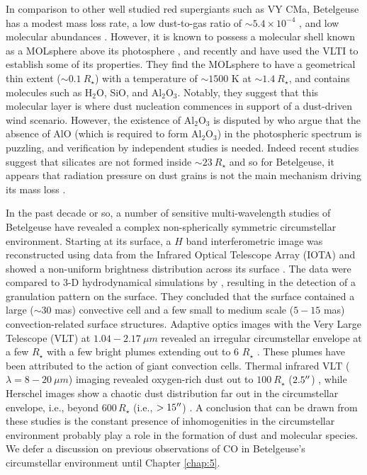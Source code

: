 In comparison to other well studied red supergiants such as VY CMa, Betelgeuse has a modest mass loss rate, a low dust-to-gas ratio of $\sim 5.4 \times 10^{-4}$ \citep{harper_2001,bowers_1987}, and low molecular abundances \citep{knapp_1980, huggins_1987, jewell_1991, lambert_1978}. However, it is known to possess a molecular shell known as a MOLsphere above its photosphere \citep{tsuji_2000}, and recently \cite{verhoelst_2006} and \cite{perrin_2007} have used the VLTI to establish some of its properties. They find the MOLsphere to have a geometrical thin extent ($\sim 0.1 \ R_{\star}$) with a temperature of $\sim 1500$ K at $\sim 1.4 \ R_{\star}$, and contains molecules such as H$_{2}$O, SiO, and Al$_{2}$O$_{3}$. Notably, they suggest that this molecular layer is where dust nucleation commences in support of a dust-driven wind scenario. However, the existence of Al$_{2}$O$_{3}$ is disputed by \cite{kaminski_2013} who argue that the absence of AlO (which is required to form Al$_{2}$O$_{3}$) in the photospheric spectrum is puzzling, and verification by independent studies is needed. Indeed recent studies suggest that silicates are not formed inside $\sim 23 \ R_{\star}$ \citep{skinner_1997,tatebe_2007} and so for Betelgeuse, it appears that radiation pressure on dust grains is not the main mechanism driving its mass loss \citep{harper_2010}.

In the past decade or so, a number of sensitive multi-wavelength studies of Betelgeuse have revealed a complex non-spherically symmetric circumstellar environment. Starting at its surface, a $H$ band interferometric image was reconstructed using data from the Infrared Optical Telescope Array (IOTA) and showed a non-uniform brightness distribution across its surface \citep{haubois_2009}. The data were compared to 3-D hydrodynamical simulations by \cite{chiavassa_2010}, resulting in the detection of a granulation pattern on the surface. They concluded that  the surface contained a large ($\sim 30$ mas) convective cell and a few small to medium scale ($5-15$ mas) convection-related surface structures. Adaptive optics images with the Very Large Telescope (VLT) at $1.04 -2.17 \ \mu m$ revealed an irregular circumstellar envelope at a few $R_{\star}$ with a few bright plumes extending out to 6 $R_{\star}$ \citep{kervella_2009}. These plumes have been attributed to the action of giant convection cells. Thermal infrared VLT ($\lambda=8-20 \ \mu m$) imaging revealed oxygen-rich dust out to $100 \ R_{\star}$ ($2.5^{\prime\prime}$) \citep{kervella_2011}, while Herschel images show a chaotic dust distribution far out in the circumstellar envelope, i.e., beyond $600\,R_{\star}$ (i.e., $> 15^{\prime\prime}$) \citep{decin_2012}. A conclusion that can be drawn from these studies is the constant presence of inhomogenities in the circumstellar environment probably play a role in the formation of dust and molecular species. We defer a discussion on previous observations of CO in Betelgeuse's circumstellar environment until Chapter \ref{chap:5}.

